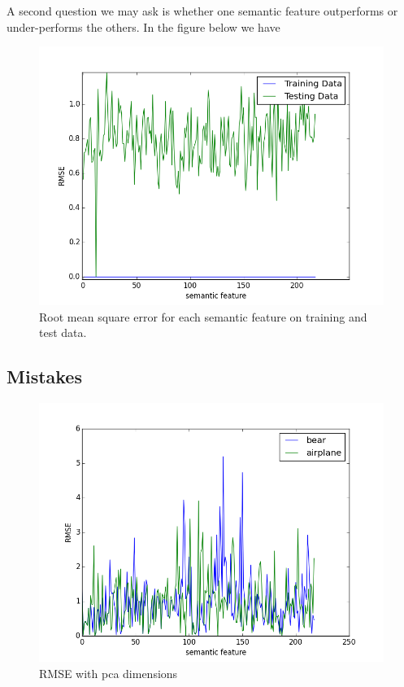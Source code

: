 \documentclass{article} %
\begin{document}
A second question we may ask is whether one semantic feature outperforms or under-performs the others. In the figure below we have

\begin{figure}[u]
\begin{center}
\includegraphics[scale=0.5]{rmse_train_test.png}
\end{center}
\caption{Root mean square error for each semantic feature on training and test data.}
\end{figure}






\subsection{Mistakes}


\begin{figure}[h]
\begin{center}
\includegraphics[scale=0.5]{mistaken_word0.png}
\end{center}
\caption{RMSE with pca dimensions}
\end{figure}
\end{document}
